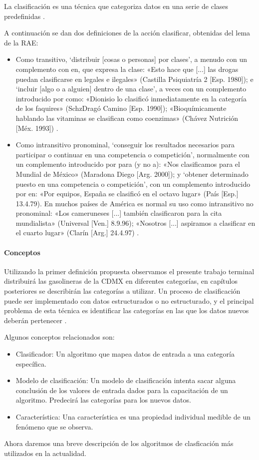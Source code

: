 La clasificación es una técnica que categoriza datos en una serie de clases predefinidas \citep{MarcoTeorico12}.

A continuación se dan dos definiciones de la acción clasificar, obtenidas del lema de la RAE:
\begin{itemize}
	\item Como transitivo, ‘distribuir [cosas o personas] por clases’, a menudo con un complemento con en, que expresa la clase: «Esto hace que [...] las drogas puedan clasificarse en legales e ilegales» (Castilla Psiquiatría 2 [Esp. 1980]); e ‘incluir [algo o a alguien] dentro de una clase’, a veces con un complemento introducido por como: «Dionisio lo clasificó inmediatamente en la categoría de los faquires» (SchzDragó Camino [Esp. 1990]); «Bioquímicamente hablando las vitaminas se clasifican como coenzimas» (Chávez Nutrición [Méx. 1993]) \citep{MarcoTeorico13}.
	\item  Como intransitivo pronominal, ‘conseguir los resultados necesarios para participar o continuar en una competencia o competición’, normalmente con un complemento introducido por para (y no a): «Nos clasificamos para el Mundial de México» (Maradona Diego [Arg. 2000]); y ‘obtener determinado puesto en una competencia o competición’, con un complemento introducido por en: «Por equipos, España se clasificó en el octavo lugar» (País [Esp.] 13.4.79). En muchos países de América es normal su uso como intransitivo no pronominal: «Los cameruneses [...] también clasificaron para la cita mundialista» (Universal [Ven.] 8.9.96); «Nosotros [...] aspiramos a clasificar en el cuarto lugar» (Clarín [Arg.] 24.4.97) \citep{MarcoTeorico13}.
\end{itemize}

\paragraph{Conceptos} Utilizando la primer definición propuesta observamos el presente trabajo terminal distribuirá las gasolineras de la CDMX en diferentes categorías, en capítulos posteriores se describirán las categorías a utilizar. Un proceso de clasificación puede ser implementado con datos estructurados o no estructurado, y el principal problema de esta técnica es identificar las categorías en las que los datos nuevos deberán pertenecer \citep{MarcoTeorico12}.

Algunos conceptos relacionados son:
\begin{itemize}
	\item Clasificador: Un algoritmo que mapea datos de entrada a una categoría específica.
	\item Modelo de clasificación: Un modelo de clasificación intenta sacar alguna conclusión de los valores de entrada dados para la capacitación de un algoritmo. Predecirá las categorías para los nuevos datos.
	\item Característica: Una característica es una propiedad individual medible de un fenómeno que se observa.
\end{itemize}
Ahora daremos una breve descripción de los algoritmos de clasficación más utilizados en la actualidad.
